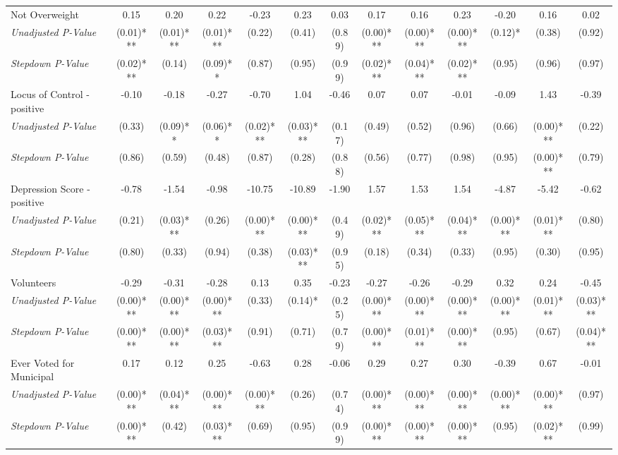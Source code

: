 \begin{tabular}{l c c c c c c c c c c c c}
Not Overweight & 0.15 & 0.20 & 0.22 & -0.23 & 0.23 & 0.03 & 0.17 & 0.16 & 0.23 & -0.20 & 0.16 & 0.02 \\
\quad \textit{Unadjusted P-Value} & (0.01)*** & (0.01)*** & (0.01)*** & (0.22) & (0.41) & (0.89) & (0.00)*** & (0.00)*** & (0.00)*** & (0.12)* & (0.38) & (0.92) \\
\quad \textit{Stepdown P-Value} & (0.02)*** & (0.14) & (0.09)** & (0.87) & (0.95) & (0.99) & (0.02)*** & (0.04)*** & (0.02)*** & (0.95) & (0.96) & (0.97) \\
Locus of Control - positive & -0.10 & -0.18 & -0.27 & -0.70 & 1.04 & -0.46 & 0.07 & 0.07 & -0.01 & -0.09 & 1.43 & -0.39 \\
\quad \textit{Unadjusted P-Value} & (0.33) & (0.09)** & (0.06)** & (0.02)*** & (0.03)*** & (0.17) & (0.49) & (0.52) & (0.96) & (0.66) & (0.00)*** & (0.22) \\
\quad \textit{Stepdown P-Value} & (0.86) & (0.59) & (0.48) & (0.87) & (0.28) & (0.88) & (0.56) & (0.77) & (0.98) & (0.95) & (0.00)*** & (0.79) \\
Depression Score - positive & -0.78 & -1.54 & -0.98 & -10.75 & -10.89 & -1.90 & 1.57 & 1.53 & 1.54 & -4.87 & -5.42 & -0.62 \\
\quad \textit{Unadjusted P-Value} & (0.21) & (0.03)*** & (0.26) & (0.00)*** & (0.00)*** & (0.49) & (0.02)*** & (0.05)*** & (0.04)*** & (0.00)*** & (0.01)*** & (0.80) \\
\quad \textit{Stepdown P-Value} & (0.80) & (0.33) & (0.94) & (0.38) & (0.03)*** & (0.95) & (0.18) & (0.34) & (0.33) & (0.95) & (0.30) & (0.95) \\
Volunteers & -0.29 & -0.31 & -0.28 & 0.13 & 0.35 & -0.23 & -0.27 & -0.26 & -0.29 & 0.32 & 0.24 & -0.45 \\
\quad \textit{Unadjusted P-Value} & (0.00)*** & (0.00)*** & (0.00)*** & (0.33) & (0.14)* & (0.25) & (0.00)*** & (0.00)*** & (0.00)*** & (0.00)*** & (0.01)*** & (0.03)*** \\
\quad \textit{Stepdown P-Value} & (0.00)*** & (0.00)*** & (0.03)*** & (0.91) & (0.71) & (0.79) & (0.00)*** & (0.01)*** & (0.00)*** & (0.95) & (0.67) & (0.04)*** \\
Ever Voted for Municipal & 0.17 & 0.12 & 0.25 & -0.63 & 0.28 & -0.06 & 0.29 & 0.27 & 0.30 & -0.39 & 0.67 & -0.01 \\
\quad \textit{Unadjusted P-Value} & (0.00)*** & (0.04)*** & (0.00)*** & (0.00)*** & (0.26) & (0.74) & (0.00)*** & (0.00)*** & (0.00)*** & (0.00)*** & (0.00)*** & (0.97) \\
\quad \textit{Stepdown P-Value} & (0.00)*** & (0.42) & (0.03)*** & (0.69) & (0.95) & (0.99) & (0.00)*** & (0.00)*** & (0.00)*** & (0.95) & (0.02)*** & (0.99) \\

\end{tabular}
